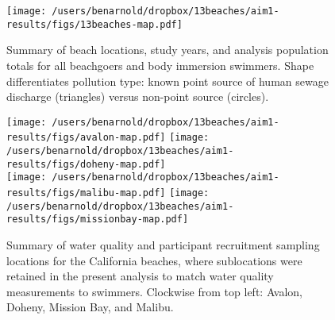 \documentclass[12pt]{article}\usepackage[]{graphicx}\usepackage[]{color}
\begin{document}
\begin{landscape}
\begin{figure}
\begin{center}
\texttt{[image: /users/benarnold/dropbox/13beaches/aim1-results/figs/13beaches-map.pdf]}
\caption{Summary of beach locations, study years, and analysis population totals for all beachgoers and body immersion swimmers. Shape differentiates pollution type: known point source of human sewage discharge (triangles) versus non-point source (circles). \label{fig:beachmap}}
\end{center}
\end{figure}
\end{landscape}

\begin{figure}
\begin{center}
\texttt{[image: /users/benarnold/dropbox/13beaches/aim1-results/figs/avalon-map.pdf]}
\texttt{[image: /users/benarnold/dropbox/13beaches/aim1-results/figs/doheny-map.pdf]} \\
\texttt{[image: /users/benarnold/dropbox/13beaches/aim1-results/figs/malibu-map.pdf]}
\texttt{[image: /users/benarnold/dropbox/13beaches/aim1-results/figs/missionbay-map.pdf]}
\begin{minipage}{0.9\textwidth}
\caption{Summary of water quality and participant recruitment sampling locations for the California beaches, where sublocations were retained in the present analysis to match water quality measurements to swimmers. Clockwise from top left: Avalon, Doheny, Mission Bay, and Malibu. \label{fig:camap}}
\end{minipage}
\end{center}
\end{figure}


\end{document}
